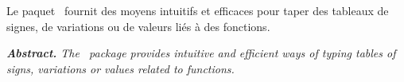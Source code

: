 \documentclass[10pt, a4paper]{article}
\begin{document}
\noindent
Le paquet \thispack\ fournit des moyens intuitifs et efficaces pour taper des tableaux de signes, de variations ou de valeurs liés à des fonctions.




\tdocsep

{\noindent
\small\itshape
\textbf{Abstract.}
The \thispack\ package provides intuitive and efficient ways of typing tables of signs, variations or values related to functions.
}
\end{document}
